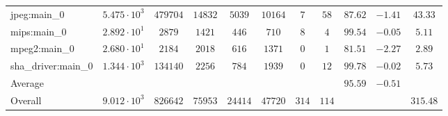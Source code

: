 \begin{tabular}{|l|c|c|c|c|c|c|c|c|c|c|}
jpeg:main\_0            & $ 5.475 \cdot 10^{3} $ & $ 479704 $ & $ 14832 $ & $ 5039  $ & $ 10164 $ & $ 7   $ & $ 58  $ & $ 87.62       $ & $ -1.41   $ & $ 43.33   $ \\
mips:main\_0            & $ 2.892 \cdot 10^{1} $ & $ 2879   $ & $ 1421  $ & $ 446   $ & $ 710   $ & $ 8   $ & $ 4   $ & $ 99.54       $ & $ -0.05   $ & $ 5.11    $ \\
mpeg2:main\_0           & $ 2.680 \cdot 10^{1} $ & $ 2184   $ & $ 2018  $ & $ 616   $ & $ 1371  $ & $ 0   $ & $ 1   $ & $ 81.51       $ & $ -2.27   $ & $ 2.89    $ \\
sha\_driver:main\_0     & $ 1.344 \cdot 10^{3} $ & $ 134140 $ & $ 2256  $ & $ 784   $ & $ 1939  $ & $ 0   $ & $ 12  $ & $ 99.78       $ & $ -0.02   $ & $ 5.73    $ \\
\hline
Average                 & $                    $ & $        $ & $       $ & $       $ & $       $ & $     $ & $     $ & $ 95.59       $ & $ -0.51   $ & $         $ \\
\hline
Overall                 & $ 9.012 \cdot 10^{3} $ & $ 826642 $ & $ 75953 $ & $ 24414 $ & $ 47720 $ & $ 314 $ & $ 114 $ & $             $ & $         $ & $ 315.48  $ \\
\hline
\end{tabular}
